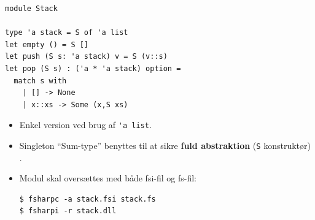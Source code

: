 \documentclass[rgb]{beamer}
\begin{document}
\begin{frame}[fragile]
\begin{footnotesize}


  \vspace{1ex}


\begin{lstlisting}[numbers=none,frame=none,mathescape]
module Stack

type 'a stack = S of 'a list
let empty () = S []
let push (S s: 'a stack) v = S (v::s)
let pop (S s) : ('a * 'a stack) option =
  match s with
    | [] -> None
    | x::xs -> Some (x,S xs)
\end{lstlisting}

  \vspace{1ex}
\begin{itemize}
\item Enkel version ved brug af \lstinline{'a list}.
\item Singleton ``Sum-type'' benyttes til at sikre \textbf{fuld abstraktion} (\lstinline{S} konstruktør) .
\item Modul skal oversættes med både fsi-fil og fs-fil:
\begin{verbatim}
$ fsharpc -a stack.fsi stack.fs
$ fsharpi -r stack.dll
\end{verbatim}
\end{itemize}

\end{footnotesize}
\end{frame}
\end{document}
